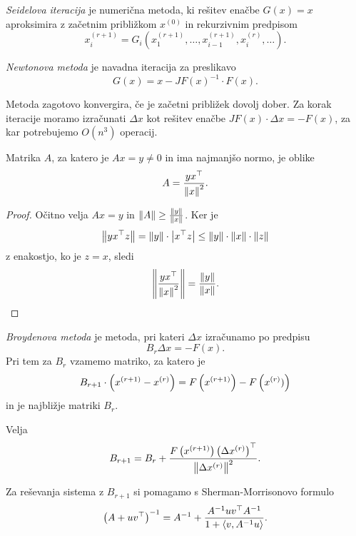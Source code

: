 \begin{definicija}
\emph{Seidelova iteracija}
je numerična metoda, ki rešitev enačbe $G(x) = x$ aproksimira z
začetnim približkom $x^{(0)}$ in rekurzivnim predpisom
\[
x_i^{(r+1)} =
G_i(x_1^{(r+1)}, \dots, x_{i-1}^{(r+1)}, x_i^{(r)}, \dots).
\]
\end{definicija}

\begin{definicija}
\emph{Newtonova metoda} je
navadna iteracija za preslikavo
\[
G(x) = x - JF(x)^{-1} \cdot F(x).
\]
\end{definicija}

\begin{opomba}
Metoda zagotovo konvergira, če je začetni približek dovolj dober.
Za korak iteracije moramo izračunati $\Delta x$ kot rešitev enačbe
$JF(x) \cdot \Delta x = -F(x)$, za kar potrebujemo $O(n^3)$
operacij.
\end{opomba}

\begin{lema}
Matrika $A$, za katero je $Ax = y \ne 0$ in ima najmanjšo normo, je
oblike
\[
A = \frac{y x^\top}{\left\lVert x\right\rVert^2}.
\]
\end{lema}

\begin{proof}
Očitno velja $Ax = y$ in $\left\lVert A\right\rVert \geq \frac{\left\lVert y\right\rVert}{\left\lVert x\right\rVert}$.
Ker je
\[
\left\lVert yx^\top z\right\rVert =
\left\lVert y\right\rVert \cdot \left\lvert x^\top z\right\rvert \leq
\left\lVert y\right\rVert \cdot \left\lVert x\right\rVert \cdot \left\lVert z\right\rVert
\]
z enakostjo, ko je $z = x$, sledi
\[
\left\lVert \frac{y x^\top}{\left\lVert x\right\rVert^2}\right\rVert = \frac{\left\lVert y\right\rVert}{\left\lVert x\right\rVert}.
\qedhere
\]
\end{proof}

\begin{definicija}
\emph{Broydenova metoda} je
metoda, pri kateri $\Delta x$ izračunamo po predpisu
\[
B_r \Delta x = -F(x).
\]
Pri tem za $B_r$ vzamemo matriko, za katero je
\[
B_{r+1} \cdot \left(x^{(r+1)} - x^{(r)}\right) =
F \left(x^{(r+1)}\right) - F \left(x^{(r)})\right)
\]
in je najbližje matriki $B_r$.
\end{definicija}

\begin{opomba}
Velja
\[
B_{r+1} = B_r + \frac{F \left(x^{(r+1)}\right) \left(\Delta x^{(r)}\right)^\top}
{\left\lVert \Delta x^{(r)}\right\rVert^2}.
\]
\end{opomba}

\begin{opomba}
Za reševanja sistema z $B_{r+1}$ si pomagamo s Sherman-Morrisonovo
formulo
\[
\left(A + uv^\top\right)^{-1} =
A^{-1} + \frac{A^{-1} u v^\top A^{-1}}{1 + \left\langle v, A^{-1} u\right\rangle}.
\]
\end{opomba}
